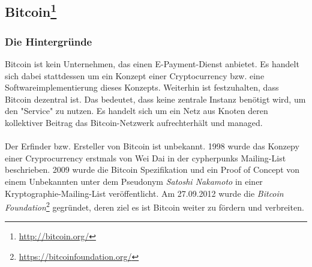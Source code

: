 \subsection[Bitcoin]{Bitcoin\footnote{\url{http://bitcoin.org/}}}
\subsubsection{Die Hintergründe}
Bitcoin ist kein Unternehmen, das einen E-Payment-Dienst anbietet. Es handelt sich dabei stattdessen um ein Konzept einer Cryptocurrency bzw. eine Softwareimplementierung dieses Konzepts. Weiterhin ist festzuhalten, dass Bitcoin dezentral ist. Das bedeutet, dass keine zentrale Instanz benötigt wird, um den "Service" zu nutzen. Es handelt sich um ein Netz aus Knoten deren kollektiver Beitrag das Bitcoin-Netzwerk aufrechterhält und managed.\\
\\
Der Erfinder bzw. Ersteller von Bitcoin ist unbekannt. 1998 wurde das Konzepy einer Cryprocurrency erstmals von Wei Dai in der cypherpunks Mailing-List beschrieben. 2009 wurde die Bitcoin Spezifikation und ein Proof of Concept von einem Unbekannten unter dem Pseudonym \emph{Satoshi Nakamoto} in einer Kryptographie-Mailing-List veröffentlicht. Am 27.09.2012 wurde die \emph{Bitcoin Foundation}\footnote{\url{https://bitcoinfoundation.org/}} gegründet, deren ziel es ist Bitcoin weiter zu fördern und verbreiten.

